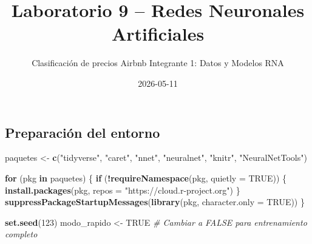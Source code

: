 \documentclass[
]{article}
\title{Laboratorio 9 -- Redes Neuronales Artificiales}
\subtitle{Clasificación de precios Airbnb \textbar{} Integrante 1: Datos
y Modelos RNA}
\author{}
\date{\vspace{-2.5em}2026-05-11}
\newenvironment{Shaded}{\begin{snugshade}}{\end{snugshade}}
\newcommand{\AttributeTok}[1]{\textcolor[rgb]{0.13,0.29,0.53}{#1}}
\newcommand{\CommentTok}[1]{\textcolor[rgb]{0.56,0.35,0.01}{\textit{#1}}}
\newcommand{\ConstantTok}[1]{\textcolor[rgb]{0.56,0.35,0.01}{#1}}
\newcommand{\ControlFlowTok}[1]{\textcolor[rgb]{0.13,0.29,0.53}{\textbf{#1}}}
\newcommand{\DecValTok}[1]{\textcolor[rgb]{0.00,0.00,0.81}{#1}}
\newcommand{\FunctionTok}[1]{\textcolor[rgb]{0.13,0.29,0.53}{\textbf{#1}}}
\newcommand{\NormalTok}[1]{#1}
\newcommand{\OtherTok}[1]{\textcolor[rgb]{0.56,0.35,0.01}{#1}}
\newcommand{\SpecialCharTok}[1]{\textcolor[rgb]{0.81,0.36,0.00}{\textbf{#1}}}
\newcommand{\StringTok}[1]{\textcolor[rgb]{0.31,0.60,0.02}{#1}}
\begin{document}
\maketitle

{
\setcounter{tocdepth}{3}
\tableofcontents
}
\hypertarget{preparaciuxf3n-del-entorno}{%
\subsection{Preparación del entorno}\label{preparaciuxf3n-del-entorno}}

\begin{Shaded}
\begin{Highlighting}[]
\NormalTok{paquetes }\OtherTok{\textless{}{-}} \FunctionTok{c}\NormalTok{(}\StringTok{"tidyverse"}\NormalTok{, }\StringTok{"caret"}\NormalTok{, }\StringTok{"nnet"}\NormalTok{, }\StringTok{"neuralnet"}\NormalTok{, }\StringTok{"knitr"}\NormalTok{, }\StringTok{"NeuralNetTools"}\NormalTok{)}

\ControlFlowTok{for}\NormalTok{ (pkg }\ControlFlowTok{in}\NormalTok{ paquetes) \{}
  \ControlFlowTok{if}\NormalTok{ (}\SpecialCharTok{!}\FunctionTok{requireNamespace}\NormalTok{(pkg, }\AttributeTok{quietly =} \ConstantTok{TRUE}\NormalTok{)) \{}
    \FunctionTok{install.packages}\NormalTok{(pkg, }\AttributeTok{repos =} \StringTok{"https://cloud.r{-}project.org"}\NormalTok{)}
\NormalTok{  \}}
  \FunctionTok{suppressPackageStartupMessages}\NormalTok{(}\FunctionTok{library}\NormalTok{(pkg, }\AttributeTok{character.only =} \ConstantTok{TRUE}\NormalTok{))}
\NormalTok{\}}

\FunctionTok{set.seed}\NormalTok{(}\DecValTok{123}\NormalTok{)}
\NormalTok{modo\_rapido }\OtherTok{\textless{}{-}} \ConstantTok{TRUE}  \CommentTok{\# Cambiar a FALSE para entrenamiento completo}


\end{Highlighting}
\end{Shaded}
\end{document}
